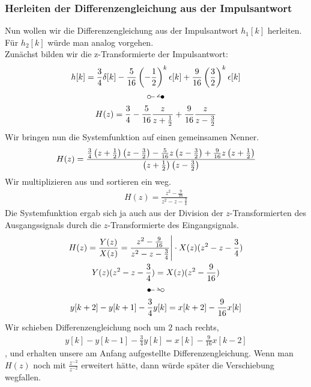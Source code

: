 \documentclass[11pt,a4paper,DIV=12]{scrartcl}
\begin{document}
\subsubsection*{Herleiten der Differenzengleichung aus der Impulsantwort}
%
Nun wollen wir die Differenzengleichung aus der Impulsantwort $h_1[k]$ 
herleiten. 
%
Für $h_2[k]$ würde man analog vorgehen.\\
%
Zunächst bilden wir die z-Transformierte der Impulsantwort:
%
\begin{gather}
	h[k]=\frac{3}{4}\delta[k]-\frac{5}{16}\left(-\frac{1}{2}\right)^k\epsilon[k]+\frac{9}{16}\left(\frac{3}{2}\right)^k\epsilon[k]\\
	\ztransf\nonumber\\
	H(z)=\frac{3}{4}-\frac{5}{16}\frac{z}{z+\frac{1}{2}}+\frac{9}{16}\frac{z}{z-\frac{3}{2}}
\end{gather}
%
Wir bringen nun die Systemfunktion auf einen gemeinsamen Nenner.
%
\begin{align}
	H(z)=
	\frac{
		\frac{3}{4}\left(z+\frac{1}{2}\right)\left(z-\frac{3}{2}\right)-\frac{5}{16}z\left(z-\frac{3}{2}\right)+\frac{9}{16}z\left(z+\frac{1}{2}\right)
	}
	{
		\left(z+\frac{1}{2}\right)\left(z-\frac{3}{2}\right)
	}
\end{align}
%
Wir multiplizieren aus und sortieren ein weg.
%
\begin{gather}
	H(z)=\frac{z^2-\frac{9}{16}}{z^2-z-\frac{3}{4}}
\end{gather}
%
Die Systemfunktion ergab sich ja auch aus der Division der $z$-Transformierten 
des Ausgangssignals durch die $z$-Transformierte des Eingangsignals.
%
\begin{gather}
	H(z)=\frac{Y(z)}{X(z)}=\frac{z^2-\frac{9}{16}}{z^2-z-\frac{3}{4}}\Bigg |\cdot X(z)(z^2-z-\frac{3}{4})\\
	Y(z)(z^2-z-\frac{3}{4})=X(z)(z^2-\frac{9}{16})\\
	\Ztransf\nonumber \\
	y[k+2]-y[k+1]-\frac{3}{4}y[k]=x[k+2]-\frac{9}{16}x[k]
\end{gather}
%
Wir schieben Differenzengleichung noch um $2$ nach rechts,
%
\begin{align}
	y[k]-y[k-1]-\frac{3}{4}y[k]=x[k]-\frac{9}{16}x[k-2]
\end{align}
%
, und erhalten unsere am Anfang aufgestellte Differenzengleichung. 
%
Wenn man $H(z)$ noch mit $\frac{z^{-2}}{z^{-2}}$ erweitert hätte, 
dann würde später die Verschiebung wegfallen.
%
\newpage
\end{document}
